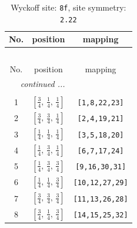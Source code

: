\documentclass[fleqn,8pt]{jsarticle}
\begin{document}
\begin{longtable}{ccc}
\caption{Wyckoff site: {\tt 8f}, site symmetry: {\tt 2.22}}
 \\
 \hline \hline
No. & position & mapping \\ \hline \endfirsthead

\multicolumn{2}{l}{\tablename\ \thetable{}} \\
 \hline \hline
No. & position & mapping \\ \hline \endhead

 \hline \hline
\multicolumn{2}{r}{\footnotesize\it continued ...} \\ \endfoot

 \hline \hline
\multicolumn{2}{r}{} \\ \endlastfoot

1 & $\left[ \frac{3}{4},\, \frac{1}{4},\, \frac{1}{4} \right]$ & {\tt [1,8,22,23]} \\ \hline
2 & $\left[ \frac{3}{4},\, \frac{3}{4},\, \frac{1}{4} \right]$ & {\tt [2,4,19,21]} \\ \hline
3 & $\left[ \frac{1}{4},\, \frac{1}{4},\, \frac{1}{4} \right]$ & {\tt [3,5,18,20]} \\ \hline
4 & $\left[ \frac{1}{4},\, \frac{3}{4},\, \frac{1}{4} \right]$ & {\tt [6,7,17,24]} \\ \hline
5 & $\left[ \frac{1}{4},\, \frac{3}{4},\, \frac{3}{4} \right]$ & {\tt [9,16,30,31]} \\ \hline
6 & $\left[ \frac{1}{4},\, \frac{1}{4},\, \frac{3}{4} \right]$ & {\tt [10,12,27,29]} \\ \hline
7 & $\left[ \frac{3}{4},\, \frac{3}{4},\, \frac{3}{4} \right]$ & {\tt [11,13,26,28]} \\ \hline
8 & $\left[ \frac{3}{4},\, \frac{1}{4},\, \frac{3}{4} \right]$ & {\tt [14,15,25,32]} \\
\end{longtable}
\renewcommand{\arraystretch}{1.2}
\end{document}
